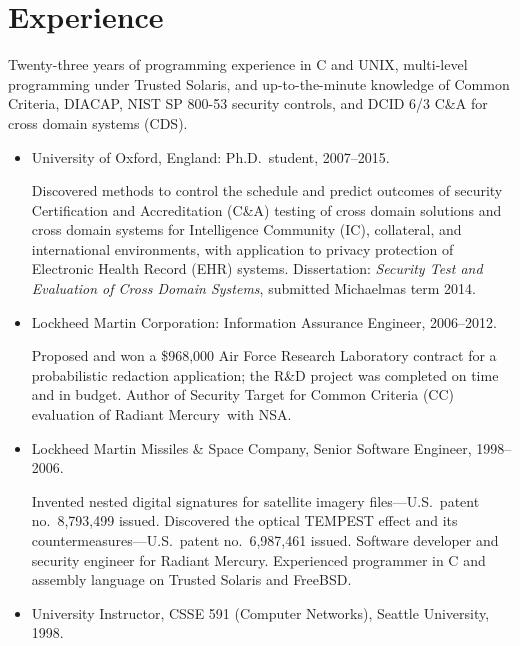 \section*{Experience}

Twenty-three years of programming experience in C and UNIX, multi-level
programming under Trusted Solaris, and
up-to-the-minute knowledge of Common Criteria, DIACAP, NIST SP 800-53
security controls, and DCID 6/3 C\&A for cross domain systems (CDS).

\begin{itemize}
	\item University of Oxford, England: Ph.D.\ student, 2007--2015.
		\begin{myquote}
            Discovered methods to control the schedule and predict
            outcomes of security Certification and Accreditation (C\&A)
            testing of cross domain solutions and cross domain systems for
            Intelligence Community (IC), collateral, and international
            environments, with application to privacy protection
            of Electronic Health Record (EHR) systems. Dissertation:
            \emph{Security Test and Evaluation of Cross Domain Systems},
            submitted Michaelmas term 2014.
		\end{myquote}

	\item Lockheed Martin Corporation: Information Assurance Engineer, 2006--2012.
		\vspace{-2mm}
		\begin{myquote}
            Proposed and won a \$968,000 Air Force Research Laboratory
            contract for a probabilistic redaction application; the
            R\&D project was completed on time and in budget. Author of
            Security Target for Common Criteria (CC) evaluation of Radiant
            Mercury\rmtrademark\ with NSA.
		\end{myquote}

	\item Lockheed Martin Missiles \& Space Company, Senior Software Engineer, 1998--2006.
		\vspace{-2mm}
		\begin{myquote}
            Invented nested digital signatures for satellite imagery
            files---U.S.\ patent no.~8,793,499 issued. Discovered the
            optical TEMPEST effect and its countermeasures---U.S.\ patent
            no.~6,987,461 issued. Software developer and security engineer
            for Radiant Mercury\rmtrademark. Experienced programmer in C
            and assembly language on Trusted Solaris and FreeBSD.
		\end{myquote}

	\item University Instructor, CSSE 591 (Computer Networks), Seattle University, 1998.
\end{itemize}

